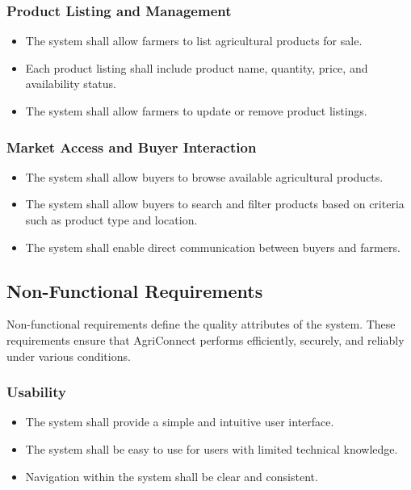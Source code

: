 \documentclass[12pt,a4paper]{article}
\begin{document}
\subsubsection{Product Listing and Management}
\begin{itemize}
    \item The system shall allow farmers to list agricultural products for sale.
    \item Each product listing shall include product name, quantity, price, and availability status.
    \item The system shall allow farmers to update or remove product listings.
\end{itemize}

\subsubsection{Market Access and Buyer Interaction}
\begin{itemize}
    \item The system shall allow buyers to browse available agricultural products.
    \item The system shall allow buyers to search and filter products based on criteria such as product type and location.
    \item The system shall enable direct communication between buyers and farmers.
\end{itemize}

\subsection{Non-Functional Requirements}

Non-functional requirements define the quality attributes of the system. These requirements ensure that AgriConnect performs efficiently, securely, and reliably under various conditions.

\subsubsection{Usability}
\begin{itemize}
    \item The system shall provide a simple and intuitive user interface.
    \item The system shall be easy to use for users with limited technical knowledge.
    \item Navigation within the system shall be clear and consistent.
\end{itemize}
\end{document}
